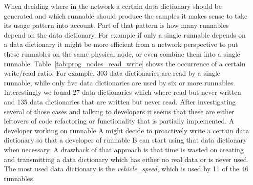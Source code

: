 When deciding where in the network a certain data dictionary should be generated and which runnable should produce the samples it makes sense to take its usage pattern into account. Part of that pattern is how many runnables depend on the data dictionary. For example if only a single runnable depends on a data dictionary it might be more efficient from a network perspective to put these runnables on the same physical node, or even combine them into a single runnable. Table~\ref{tab:prog_nodes_read_write} shows the occurrence of a certain write/read ratio. For example, 303 data dictionaries are read by a single runnable, while only five data dictionaries are used by six or more runnables. Interestingly we found 27 data dictionaries which where read but never written and 135 data dictionaries that are written but never read. After investigating several of those cases and talking to developers it seems that these are either leftovers of code refactoring or functionality that is partially implemented. A developer working on runnable A might decide to proactively write a certain data dictionary so that a developer of runnable B can start using that data dictionary when necessary. A drawback of that approach is that time is wasted on creating and transmitting a data dictionary which has either no real data or is never used. The most used data dictionary is the \textit{vehicle\_speed}, which is used by 11 of the 46 runnables.
